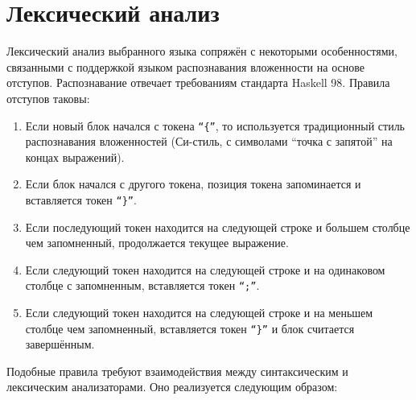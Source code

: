 \documentclass[a4paper,12pt]{article}
\begin{document}
\section{Лексический анализ}

Лексический анализ выбранного языка сопряжён с некоторыми особенностями,
связанными с поддержкой языком распознавания вложенности на основе
отступов. Распознавание отвечает требованиям стандарта Haskell 98. Правила
отступов таковы:

\begin{enumerate}
\item Если новый блок начался с токена \texttt{``\{''}, то используется традиционный
  стиль распознавания вложенностей (Си-стиль, с символами ``точка с запятой'' на
  концах выражений).
\item Если блок начался с другого токена, позиция токена запоминается и
  вставляется токен \texttt{``\}''}.
\item Если последующий токен находится на следующей строке и большем столбце чем
  запомненный, продолжается текущее выражение.
\item Если следующий токен находится на следующей строке и на одинаковом столбце
  с запомненным, вставляется токен \texttt{``;''}.
\item Если следующий токен находится на следующей строке и на меньшем столбце
  чем запомненный, вставляется токен \texttt{``\}''} и блок считается завершённым.
\end{enumerate}

Подобные правила требуют взаимодействия между синтаксическим и лексическим
анализаторами. Оно реализуется следующим образом:
\end{document}
